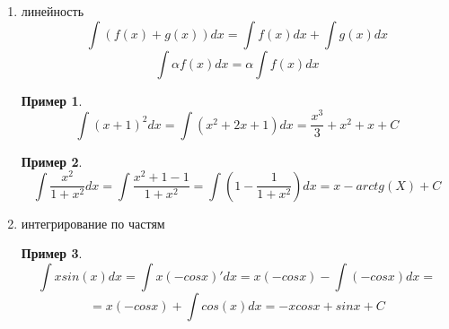 \documentclass[a4paper]{article}
\theoremstyle{definition}
\newtheorem*{exmp}{Пример}
\newtheorem*{comment}{Замечание}
\numberwithin{theorem}{subsection}
\numberwithin{lemma}{subsection}
\numberwithin{definition}{subsection}
\numberwithin{comment*}{subsection}
\numberwithin{consequence}{subsection}
\numberwithin{property}{subsection}
\begin{document}
\begin{enumerate}
 \item линейность
       $$ \int (f(x) + g(x))dx = \int f(x)dx + \int g(x)dx$$
       $$ \int \alpha f(x) dx = \alpha \int f(x)dx$$
       \begin{exmp}
        $$ \int (x+1)^2 dx = \int (x^2 + 2x + 1)dx = \frac{x^3}{3} + x^2 + x + C $$
       \end{exmp}
       \begin{exmp}
        $$ \int \frac{x^2}{1+x^2} dx = \int \frac{x^2 + 1 -1}{1+x^2} = \int (1 - \frac{1}{1+x^2})dx = x - arctg(X) + C $$
       \end{exmp}
 \item интегрирование по частям

       \begin{exmp}
        $$ \int x sin(x) dx = \int x (-cosx)'dx = x(-cosx) - \int (-cosx)dx =$$
        $$= x(-cosx) + \int cos(x)dx=-xcosx + sinx + C$$
       \end{exmp}
\end{enumerate}
\end{document}
